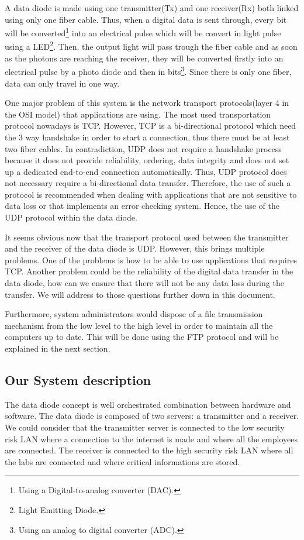 \documentclass[a4paper,10pt]{article}
\begin{document}
A data diode is made using one transmitter(Tx) and one receiver(Rx) both linked using only one fiber cable. Thus, when a digital data is sent through, every bit will be converted\footnote{Using a Digital-to-analog converter (DAC).} into an electrical pulse which will be convert in light pulse using a LED\footnote{Light Emitting Diode.}. Then, the output light will pass trough the fiber cable and as soon as the photons are reaching the receiver, they will be converted firstly into an electrical pulse by a photo diode and then in bits\footnote{Using an analog to digital converter (ADC).}. Since there is only one fiber, data can only travel in one way.

One major problem of this system is the network transport protocols(layer 4 in the OSI model) that applications are using. The most used transportation protocol nowadays is TCP. However, TCP is a bi-directional protocol which need the 3 way handshake in order to start a connection, thus there must be at least two fiber cables. In contradiction, UDP does not require a handshake process because it does not provide reliability, ordering, data integrity and does not set up a dedicated end-to-end connection automatically. Thus, UDP protocol does not necessary require a bi-directional data transfer. Therefore, the use of such a protocol is recommended when dealing with applications that are not sensitive to data loss or that implements an error checking system. Hence, the use of the UDP protocol within the data diode.

It seems obvious now that the transport protocol used between the transmitter and the receiver of the data diode is UDP. However, this brings multiple problems. One of the problems is how to be able to use applications that requires TCP. Another problem could be the reliability of the digital data transfer in the data diode, how can we ensure that there will not be any data loss during the transfer. We will address to those questions further down in this document.\bigskip

Furthermore, system administrators would dispose of a file transmission mechanism from the low level to the high level in order to maintain all the computers up to date. This will be done using the FTP protocol and will be explained in the next section.

\subsection{Our System description}
The data diode concept is well orchestrated combination between hardware and software. The data diode is composed of two servers: a transmitter and a receiver. We could consider that the transmitter server is connected to the low security risk LAN where a connection to the internet is made and where all the employees are connected. The receiver is connected to the high security risk LAN where all the labs are connected and where critical informations are stored.
\end{document}
